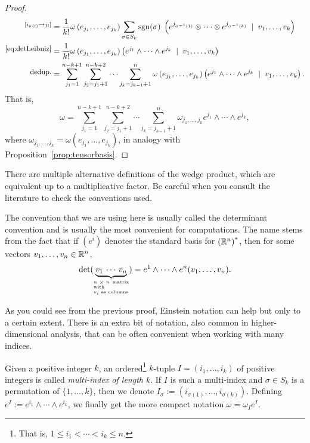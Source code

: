 \begin{proof}
\begin{align}
    \overset{[i_{\sigma(l)} \mapsto j_l]}{}
     & = \frac1{k!} \omega\left(e_{j_1}, \ldots, e_{j_k}\right) \sum_{\sigma\in S_k} \operatorname{sgn}(\sigma) \;\left(e^{j_{\sigma^{-1}(1)}}\otimes \cdots \otimes e^{j_{\sigma^{-1}(k)}} \;\mid\; v_1, \ldots, v_k\right) \\
    \overset{\mbox{\small\eqref{eq:detLeibniz}}}{}
     & = \frac1{k!} \omega\left(e_{j_1}, \ldots, e_{j_k}\right) \left( e^{j_1}\wedge \cdots \wedge e^{j_k} \;\mid\; v_1, \ldots, v_k\right)                                                                    \\
    \overset{\mbox{\small dedup.}}{}
     & = \sum_{j_1=1}^{n-k+1}\sum_{j_2=j_1+1}^{n-k+2}\cdots \sum_{j_k=j_{k-1}+1}^{n} \omega\left(e_{j_1}, \ldots, e_{j_k}\right) \left(e^{j_1}\wedge \cdots \wedge e^{j_k} \;\mid\; v_1, \ldots, v_k\right).
  \end{align}
  That is,
  \begin{equation}
    \omega = \sum_{j_1=1}^{n-k+1}\sum_{j_2=j_1+1}^{n-k+2}\cdots \sum_{j_k=j_{k-1}+1}^{n} \omega_{j_1, \ldots, j_k} e^{j_1}\wedge \cdots \wedge e^{j_k},
  \end{equation}
  where $\omega_{j_1, \ldots, j_k} = \omega\left(e_{j_1}, \ldots, e_{j_k}\right)$, in analogy with Proposition~\ref{prop:tensorbasis}.
\end{proof}

\begin{remark}
  There are multiple alternative definitions of the wedge product, which are equivalent up to a multiplicative factor.
  Be careful when you consult the literature to check the conventions used.

  The convention that we are using here is usually called the determinant convention and is usually the most convenient for computations. The name stems from the fact that if $(e^i)$ denotes the standard basis for ${(\mathbb{R}^n)}^*$, then for some vectors $v_1, \ldots, v_n \in\mathbb{R}^n$,
  \begin{equation}
    \det(\LaTeXunderbrace{v_1 \,\cdots\, v_n}_{\parbox{1.5cm}{\tiny $n\times n$ matrix with\\$v_i$ as columns}}) = e^1\wedge\cdots\wedge e^n(v_1,\ldots,v_n).
  \end{equation}
\end{remark}

As you could see from the previous proof, Einstein notation can help but only to a certain extent.
There is an extra bit of notation, also common in higher-dimensional analysis, that can be often convenient when working with many indices.
\begin{notation}
  Given a positive integer $k$, an ordered\footnote{That is, $1\leq i_1<\cdots<i_k\leq n$.} $k$-tuple $I=(i_1, \ldots, i_k)$ of positive integers is called \emph{multi-index of length $k$}.
  If $I$ is such a multi-index and $\sigma\in S_k$ is a permutation of $\{1,\ldots,k\}$, then we denote $I_\sigma := (i_{\sigma(1)}, \ldots, i_{\sigma(k)})$.
  Defining $e^I := e^{i_1}\wedge\cdots\wedge e^{i_k}$, we finally get the more compact notation $\omega = \omega_I e^I$.
\end{notation}

